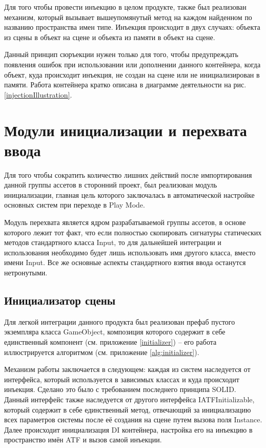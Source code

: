Для того чтобы провести инъекцию в целом продукте, также был реализован механизм, который вызывает вышеупомянутый метод на каждом найденном по названию пространства имен типе. Инъекция происходит в двух случаях: объекта из сцены в объект на сцене и объекта из памяти в объект на сцене. 

Данный принцип сюръекции нужен только для того, чтобы предупреждать появления ошибок при использовании или дополнении данного контейнера, когда объект, куда происходит инъекция, не создан на сцене или не инициализирован в памяти. Работа контейнера кратко описана в диаграмме деятельности на рис. \ref{injectionIllustration}.

\section{Модули инициализации и перехвата ввода}
Для того чтобы сократить количество лишних действий после импортирования данной группы ассетов в сторонний проект, был реализован модуль инициализации, главная цель которого заключалась в автоматической настройке основных систем при переходе в Play Mode.

Модуль перехвата является ядром разрабатываемой группы ассетов, в основе которого лежит тот факт, что если полностью скопировать сигнатуры статических методов стандартного класса Input, то для дальнейшей интеграции и использования необходимо будет лишь использовать имя другого класса, вместо имени Input. Все же основные аспекты стандартного взятия ввода останутся нетронутыми.

\subsection{Инициализатор сцены}
Для легкой интеграции данного продукта был реализован префаб пустого экземпляра класса GameObject, композиция которого содержит в себе единственный компонент (см. приложение \ref{initializer}) -- его работа иллюстрируется алгоритмом (см. приложение \ref{alg:initializer}).

Механизм работы заключается в следующем: каждая из систем наследуется от интерфейса, который используется в зависимых классах и куда происходит инъекция. Сделано это было с требованием последнего принципа SOLID. Данный интерфейс также наследуется от другого интерфейса IATFInitializable, который содержит в себе единственный метод, отвечающий за инициализацию всех параметров системы после её создания на сцене путем вызова поля Instance. Далее происходит инициализация DI контейнера, настройка его на инъекцию в пространство имён ATF и вызов самой инъекции.

